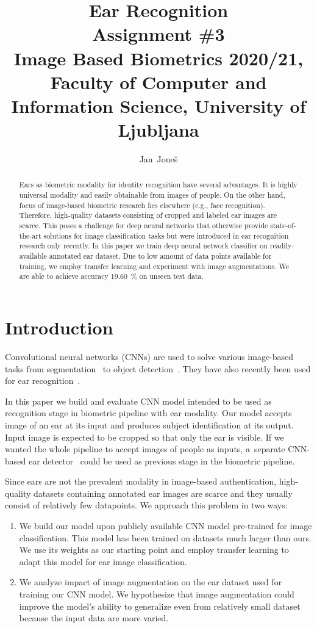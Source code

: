 \documentclass[9pt]{IEEEtran}
\title{\vspace{0ex} %
Ear Recognition
\\ \large{Assignment \#3}\\ \normalsize{Image Based Biometrics 2020/21, Faculty of Computer and Information Science, University of Ljubljana}}
\author{ %
Jan~Joneš
\vspace{-4.0ex}
}
\begin{document}
\maketitle

\begin{abstract}
    Ears as biometric modality for identity recognition have several advantages.
    It is highly universal modality and easily obtainable from images of people.
    On the other hand, focus of image-based biometric research lies elsewhere (e.g., face recognition).
    Therefore, high-quality datasets consisting of cropped and labeled ear images are scarce.
    This poses a challenge for deep neural networks that otherwise provide state-of-the-art solutions for image classification tasks but were introduced in ear recognition research only recently.
    In this paper we train deep neural network classifier on readily-available annotated ear dataset.
    Due to low amount of data points available for training, we employ transfer learning and experiment with image augmentations.
    We are able to achieve accuracy 19.60~\% on unseen test data.
\end{abstract}

\section{Introduction}

Convolutional neural networks (CNNs) are used to solve various image-based tasks from segmentation~\cite{chen2014semantic} to object detection~\cite{tan2020efficientdet}.
They have also recently been used for ear recognition~\cite{emersic2017,dodge2018,emersic2019,eyiokur2017,zhang2018}.

In this paper we build and evaluate CNN model intended to be used as recognition stage in biometric pipeline with ear modality.
Our model accepts image of an ear at its input and produces subject identification at its output.
Input image is expected to be cropped so that only the ear is visible.
If we wanted the whole pipeline to accept images of people as inputs, a~separate CNN-based ear detector~\cite{emersic2018} could be used as previous stage in the biometric pipeline.

Since ears are not the prevalent modality in image-based authentication, high-quality datasets containing annotated ear images are scarce and they usually consist of relatively few datapoints.
We approach this problem in two ways:
\begin{enumerate}
    \item We build our model upon publicly available CNN model pre-trained for image classification.
          This model has been trained on datasets much larger than ours.
          We use its weights as our starting point and employ transfer learning to adapt this model for ear image classification.
    \item We analyze impact of image augmentation on the ear dataset used for training our CNN model.
          We hypothesize that image augmentation could improve the model's ability to generalize even from relatively small dataset because the input data are more varied.
\end{enumerate}
\end{document}
